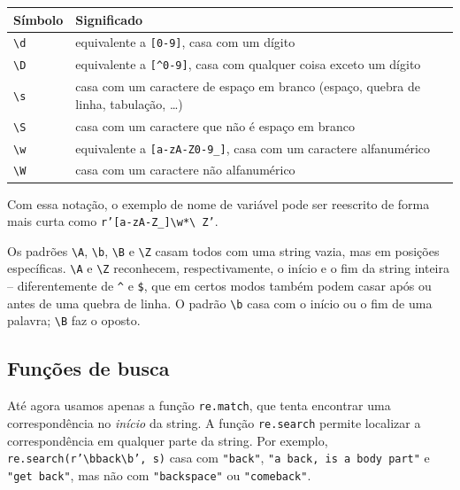 \documentclass[11pt,a4paper]{article}
\begin{document}
\begin{center}
\begin{tabularx}{\textwidth}{lX}
\toprule
\textbf{Símbolo} & \textbf{Significado} \\
\midrule
\texttt{\textbackslash d} & equivalente a \texttt{[0-9]}, casa com um dígito \\
\texttt{\textbackslash D} & equivalente a \texttt{[\^{}0-9]}, casa com qualquer coisa exceto um dígito \\
\texttt{\textbackslash s} & casa com um caractere de espaço em branco (espaço, quebra de linha, tabulação, \dots) \\
\texttt{\textbackslash S} & casa com um caractere que não é espaço em branco \\
\texttt{\textbackslash w} & equivalente a \texttt{[a-zA-Z0-9\_]}, casa com um caractere alfanumérico \\
\texttt{\textbackslash W} & casa com um caractere não alfanumérico \\
\bottomrule
\end{tabularx}
\end{center}

Com essa notação, o exemplo de nome de variável pode ser reescrito de
forma mais curta como \texttt{r'[a-zA-Z\_]\textbackslash w*\textbackslash
Z'}.

Os padrões \texttt{\textbackslash A}, \texttt{\textbackslash b},
\texttt{\textbackslash B} e \texttt{\textbackslash Z} casam todos com uma
string vazia, mas em posições específicas. \texttt{\textbackslash A} e
\texttt{\textbackslash Z} reconhecem, respectivamente, o início e o fim
da string inteira -- diferentemente de \texttt{\^{}} e \texttt{\$}, que em
certos modos também podem casar após ou antes de uma quebra de linha. O
padrão \texttt{\textbackslash b} casa com o início ou o fim de uma
palavra; \texttt{\textbackslash B} faz o oposto.

\subsection{Funções de busca}

Até agora usamos apenas a função \texttt{re.match}, que tenta encontrar
uma correspondência no \emph{início} da string. A função \texttt{re.search}
permite localizar a correspondência em qualquer parte da string. Por
exemplo, \texttt{re.search(r'\textbackslash bback\textbackslash b', s)}
casa com \texttt{"back"}, \texttt{"a back, is a body part"} e
\texttt{"get back"}, mas não com \texttt{"backspace"} ou
\texttt{"comeback"}.
\end{document}
